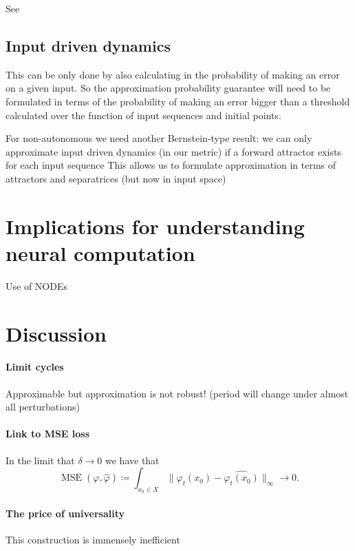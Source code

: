 \documentclass{article}
\theoremstyle{definition}
\theoremstyle{remark}
\begin{document}
See \citep{Sagodi2024a}


\subsection{Input driven dynamics}

This can be only done by also calculating in the probability of making an error on a given input.
So the approximation probability guarantee will need to be formulated in terms of the probability of making an error bigger than a threshold calculated over the function of input sequences and initial points.



For non-autonomous we need another Bernstein-type result:
we can only approximate input driven dynamics (in our metric) if a forward attractor exists for each input sequence 
This allows us to formulate approximation in terms of attractors and separatrices (but now in input space)


\section{Implications for understanding neural computation}

Use of NODEs \citep{kim2021inferring}




\section{Discussion}


\paragraph{Limit cycles}
Approximable but approximation is not robust! (period will change under almost all perturbations)


\paragraph{Link to MSE loss}
In the limit that $\delta\rightarrow 0$ we have that 
\[\operatorname{MSE}(\varphi, \hat{\varphi}) \coloneqq \int_{x_0\in X} \|\varphi_t(x_0) - \hat{\varphi_t(x_0)}\|_\infty \rightarrow 0.\]


\paragraph{The price of universality}
This construction is immensely inefficient
\end{document}
